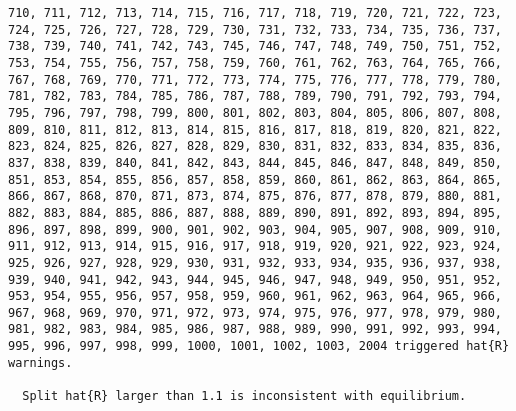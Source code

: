 \documentclass[
  letterpaper,
  DIV=11,
  numbers=noendperiod]{scrartcl}
\begin{document}
\begin{verbatim}
710, 711, 712, 713, 714, 715, 716, 717, 718, 719, 720, 721, 722, 723, 724, 725, 726, 727, 728, 729, 730, 731, 732, 733, 734, 735, 736, 737, 738, 739, 740, 741, 742, 743, 745, 746, 747, 748, 749, 750, 751, 752, 753, 754, 755, 756, 757, 758, 759, 760, 761, 762, 763, 764, 765, 766, 767, 768, 769, 770, 771, 772, 773, 774, 775, 776, 777, 778, 779, 780, 781, 782, 783, 784, 785, 786, 787, 788, 789, 790, 791, 792, 793, 794, 795, 796, 797, 798, 799, 800, 801, 802, 803, 804, 805, 806, 807, 808, 809, 810, 811, 812, 813, 814, 815, 816, 817, 818, 819, 820, 821, 822, 823, 824, 825, 826, 827, 828, 829, 830, 831, 832, 833, 834, 835, 836, 837, 838, 839, 840, 841, 842, 843, 844, 845, 846, 847, 848, 849, 850, 851, 853, 854, 855, 856, 857, 858, 859, 860, 861, 862, 863, 864, 865, 866, 867, 868, 870, 871, 873, 874, 875, 876, 877, 878, 879, 880, 881, 882, 883, 884, 885, 886, 887, 888, 889, 890, 891, 892, 893, 894, 895, 896, 897, 898, 899, 900, 901, 902, 903, 904, 905, 907, 908, 909, 910, 911, 912, 913, 914, 915, 916, 917, 918, 919, 920, 921, 922, 923, 924, 925, 926, 927, 928, 929, 930, 931, 932, 933, 934, 935, 936, 937, 938, 939, 940, 941, 942, 943, 944, 945, 946, 947, 948, 949, 950, 951, 952, 953, 954, 955, 956, 957, 958, 959, 960, 961, 962, 963, 964, 965, 966, 967, 968, 969, 970, 971, 972, 973, 974, 975, 976, 977, 978, 979, 980, 981, 982, 983, 984, 985, 986, 987, 988, 989, 990, 991, 992, 993, 994, 995, 996, 997, 998, 999, 1000, 1001, 1002, 1003, 2004 triggered hat{R} warnings.

  Split hat{R} larger than 1.1 is inconsistent with equilibrium.



\end{verbatim}
\end{document}
